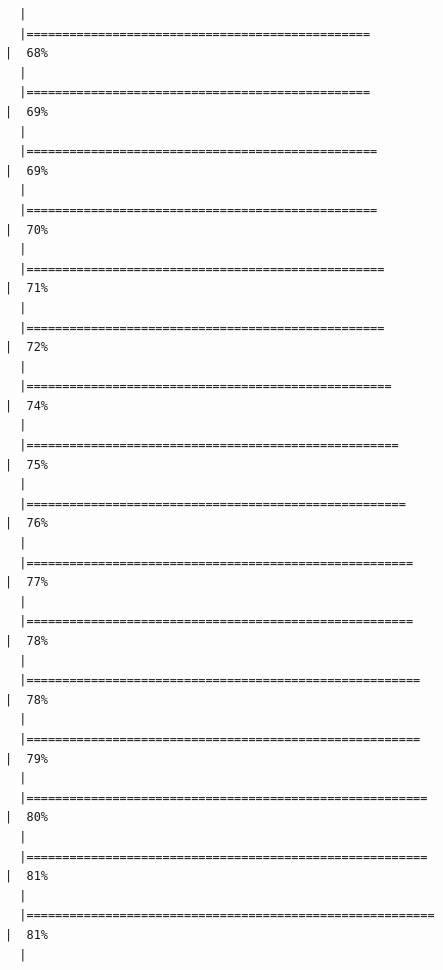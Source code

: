 \documentclass[
  letterpaper,
  DIV=11,
  numbers=noendperiod]{scrreprt}
\begin{document}
\begin{verbatim}
  |                                                                            
  |================================================                      |  68%
  |                                                                            
  |================================================                      |  69%
  |                                                                            
  |=================================================                     |  69%
  |                                                                            
  |=================================================                     |  70%
  |                                                                            
  |==================================================                    |  71%
  |                                                                            
  |==================================================                    |  72%
  |                                                                            
  |===================================================                   |  74%
  |                                                                            
  |====================================================                  |  75%
  |                                                                            
  |=====================================================                 |  76%
  |                                                                            
  |======================================================                |  77%
  |                                                                            
  |======================================================                |  78%
  |                                                                            
  |=======================================================               |  78%
  |                                                                            
  |=======================================================               |  79%
  |                                                                            
  |========================================================              |  80%
  |                                                                            
  |========================================================              |  81%
  |                                                                            
  |=========================================================             |  81%
  |                                                                            

\end{verbatim}
\end{document}
